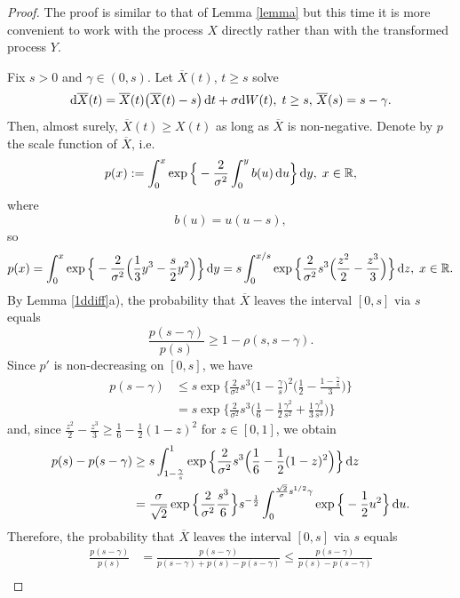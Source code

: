 \documentclass[sn-mathphys-num]{sn-jnl}
\theoremstyle{definition}
\newcommand{\scr}[1]{\mathscr #1}
\numberwithin{equation}{section} \theoremstyle{remark}
\renewcommand{\d}{\hbox{d}}
\def\R{\mathbb R}
\def\d{\text{\rm{d}}} \def\bb{\beta} \def\aa{\alpha} \def\D{\scr D}
\newcommand{\1}{\mathbbm{1}}
\renewcommand{\bar}{\overline}
\begin{document}
\begin{proof}
  The proof is similar to that of Lemma \ref{lemma} but this time it is more convenient to work with the process $X$ directly rather than with the transformed process $Y$.

  Fix $s > 0$ and $\gamma \in (0,s)$. Let $\bar X(t)$, $t \geq s$ solve
  $$
\d \bar X(t)=\bar X(t)\big(\bar X(t)-s\big)\,\d t+\sigma \d W(t),\;t \geq s,\,\bar X(s)=s-\gamma.
$$
Then, almost surely, $\bar X(t) \geq X(t)$ as long as $\bar X$ is non-negative. Denote by $p$ the scale function of $\bar X$, i.e.
$$
p(x):=\int_0^x\exp \Big\{ -\frac 2 {\sigma^2}\int_0^y b(u)\,\d u\Big\}\,\d y, \; x \in \R,
$$
where
$$
b(u)= u(u-s),
$$
so
$$
p(x)=\int_0^x\exp \Big\{ -\frac 2 {\sigma^2}\Big(\frac 13 y^3 - \frac s2 y^2\Big)  \Big\}\,\d y=s\int_0^{x/s}\exp\Big\{\frac 2 {\sigma^2} s^3\Big(\frac{z^2}2-\frac{z^3}3  \Big)   \Big\}\,\d z  , \; x \in \R.
$$
By Lemma \ref{1ddiff}a), the probability that $\bar X$ leaves the interval $[0,s]$ via $s$ equals
\begin{equation}\label{vgl}
\frac {p(s-\gamma)}{p(s)}\geq 1-\rho(s,s-\gamma).
\end{equation}
Since $p'$ is non-decreasing on $[0,s]$, we have
\begin{align*}
  p(s-\gamma)&\leq s \exp\Big\{\frac 2 {\sigma^2} s^3\Big(1-\frac\gamma s\Big)^2\Big(\frac 12 -\frac{1-\frac \gamma s}3 \Big)   \Big\}\\
  &= s\exp\Big\{\frac 2 {\sigma^2} s^3\Big(\frac 16 -\frac 12 \frac {\gamma^2}{s^2}+\frac 13 \frac {\gamma^3}{s^3}\Big)\Big\}
\end{align*}
and, since $\frac{z^2}2-\frac{z^3}3\geq \frac 16-\frac 12(1-z)^2$ for $z \in  [0,1]$, we obtain
\begin{align*}
  p(s)-p(s-\gamma)&\geq s\int_{1-\frac \gamma s}^1 \exp\Big\{ \frac 2 {\sigma^2} s^3\Big(\frac 16-\frac 12 (1-z)^2\Big)\Big\}\,\d z\\
&= \frac {\sigma}{\sqrt{2}} \exp\Big\{ \frac 2 {\sigma^2} \frac {s^3}6\Big\} s^{-\frac 12}\int_0^{\frac {\sqrt{2}}\sigma s^{1/2}\gamma} \exp\Big\{-\frac 1 2 u^2\Big\}\,\d u.
\end{align*}
Therefore, the probability that $\bar X$ leaves the interval $[0,s]$ via $s$ equals
\begin{align*}
  \frac{p(s-\gamma)}{p(s)}&=\frac{p(s-\gamma)}{p(s-\gamma)+p(s)-p(s-\gamma)}\leq \frac{p(s-\gamma)}{p(s)-p(s-\gamma)}\\

\end{align*}
\end{proof}
\end{document}

